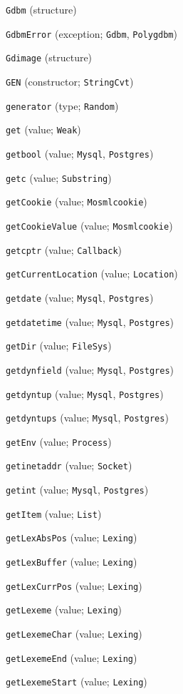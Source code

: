 \begin{description}
\item[] \verb"Gdbm" (structure)
\item[] \verb"GdbmError" (exception; \verb"Gdbm", \verb"Polygdbm")
\item[] \verb"Gdimage" (structure)
\item[] \verb"GEN" (constructor; \verb"StringCvt")
\item[] \verb"generator" (type; \verb"Random")
\item[] \verb"get" (value; \verb"Weak")
\item[] \verb"getbool" (value; \verb"Mysql", \verb"Postgres")
\item[] \verb"getc" (value; \verb"Substring")
\item[] \verb"getCookie" (value; \verb"Mosmlcookie")
\item[] \verb"getCookieValue" (value; \verb"Mosmlcookie")
\item[] \verb"getcptr" (value; \verb"Callback")
\item[] \verb"getCurrentLocation" (value; \verb"Location")
\item[] \verb"getdate" (value; \verb"Mysql", \verb"Postgres")
\item[] \verb"getdatetime" (value; \verb"Mysql", \verb"Postgres")
\item[] \verb"getDir" (value; \verb"FileSys")
\item[] \verb"getdynfield" (value; \verb"Mysql", \verb"Postgres")
\item[] \verb"getdyntup" (value; \verb"Mysql", \verb"Postgres")
\item[] \verb"getdyntups" (value; \verb"Mysql", \verb"Postgres")
\item[] \verb"getEnv" (value; \verb"Process")
\item[] \verb"getinetaddr" (value; \verb"Socket")
\item[] \verb"getint" (value; \verb"Mysql", \verb"Postgres")
\item[] \verb"getItem" (value; \verb"List")
\item[] \verb"getLexAbsPos" (value; \verb"Lexing")
\item[] \verb"getLexBuffer" (value; \verb"Lexing")
\item[] \verb"getLexCurrPos" (value; \verb"Lexing")
\item[] \verb"getLexeme" (value; \verb"Lexing")
\item[] \verb"getLexemeChar" (value; \verb"Lexing")
\item[] \verb"getLexemeEnd" (value; \verb"Lexing")
\item[] \verb"getLexemeStart" (value; \verb"Lexing")

\end{description}
